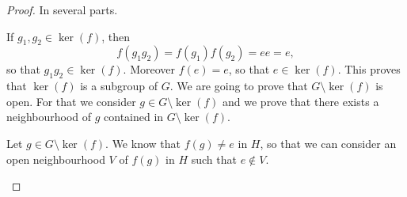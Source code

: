\begin{proof}
    In several parts.
    \begin{subproof}
            If \( g_1,g_2\in \ker(f)\), then
            \begin{equation}
                f(g_1g_2)=f(g_1)f(g_2)=ee=e,
            \end{equation}
            so that \( g_1g_2\in\ker(f)\). Moreover \( f(e)=e\), so that \( e\in \ker(f)\). This proves that \( \ker(f)\) is a subgroup of \( G\).
            We are going to prove that \( G\setminus\ker(f)\) is open. For that we consider \( g\in G\setminus\ker(f)\) and we prove that there exists a neighbourhood of \( g\) contained in \( G\setminus\ker(f)\).

            Let \( g\in G\setminus\ker(f)\). We know that \( f(g)\neq e\) in \( H\), so that we can consider an open neighbourhood \( V\) of \( f(g)\) in \( H\) such that \( e\notin V\).


\end{subproof}
\end{proof}
